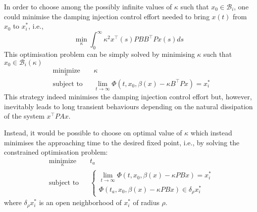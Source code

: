 {%
In order to choose among the possibly infinite values of $\kappa$ such that  $x_0\in\mathcal{B}_i$, one could minimise the damping injection control effort needed to bring $x(t)$ from $x_0$ to $x_i^*$, i.e.,
\[\min_\kappa\int_0^\infty \kappa^2x^\top(s)PBB^\top Px(s)ds\]
This optimisation problem can be simply solved by minimising $\kappa$ such that $x_0\in\mathcal{B}_i(\kappa)$  
\begin{equation*}
\begin{aligned}
& \underset{\kappa}{\text{minimize}}
& & \kappa \\
& \text{subject to}
& &\lim\limits_{t\rightarrow\infty}\Phi(t,x_0,\beta(x)-\kappa B^\top Px)=x^*_i
\end{aligned}
\end{equation*}
This strategy indeed minimises the damping injection control effort but, however, inevitably leads to long transient behaviours depending on the natural dissipation of the system $x^\top PA x$.

Instead, it would be possible to choose on optimal value of $\kappa$ which instead minimises the approaching time to the desired fixed point, i.e., by solving the constrained optimisation problem:
%
\begin{equation*}
\begin{aligned}
& \underset{\kappa}{\text{minimize}}
& & t_a \\
& \text{subject to}
& & \left\{
\begin{matrix*}
\lim\limits_{t\rightarrow\infty}\Phi(t,x_0,\beta(x)-\kappa PBx)=x^*_i\\
\Phi(t_a,x_0,\beta(x)-\kappa PBx)\in\delta_\rho x_i^*
\end{matrix*}
\right.
\end{aligned}
\end{equation*}
%
where $\delta_\rho x^*_i$ is an open neighborhood of $x_i^*$ of radius $\rho$.

}
